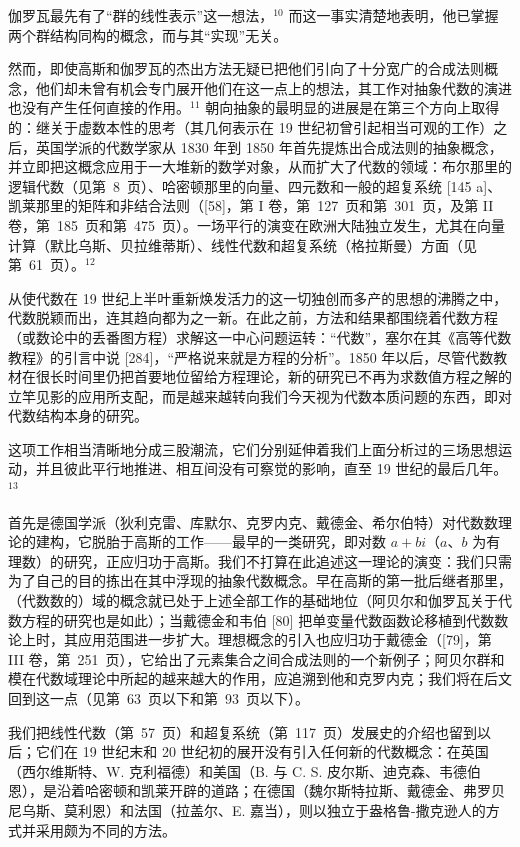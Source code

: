 伽罗瓦最先有了“群的线性表示”这一想法，\(^{10}\) 而这一事实清楚地表明，他已掌握两个群结构同构的概念，而与其“实现”无关。

然而，即使高斯和伽罗瓦的杰出方法无疑已把他们引向了十分宽广的合成法则概念，他们却未曾有机会专门展开他们在这一点上的想法，其工作对抽象代数的演进也没有产生任何直接的作用。\(^{11}\) 朝向抽象的最明显的进展是在第三个方向上取得的：继关于虚数本性的思考（其几何表示在 19 世纪初曾引起相当可观的工作）之后，英国学派的代数学家从 1830 年到 1850 年首先提炼出合成法则的抽象概念，并立即把这概念应用于一大堆新的数学对象，从而扩大了代数的领域：布尔那里的逻辑代数（见第~8~页）、哈密顿那里的向量、四元数和一般的超复系统 {[}145 a{]}、凯莱那里的矩阵和非结合法则（{[}58{]}，第 I 卷，第~127~页和第~301~页，及第 II 卷，第~185~页和第~475~页）。一场平行的演变在欧洲大陆独立发生，尤其在向量计算（默比乌斯、贝拉维蒂斯）、线性代数和超复系统（格拉斯曼）方面（见第~61~页）。\(^{12}\)

从使代数在 19 世纪上半叶重新焕发活力的这一切独创而多产的思想的沸腾之中，代数脱颖而出，连其趋向都为之一新。在此之前，方法和结果都围绕着代数方程（或数论中的丢番图方程）求解这一中心问题运转：“代数”，塞尔在其《高等代数教程》的引言中说 {[}284{]}，“严格说来就是方程的分析”。1850 年以后，尽管代数教材在很长时间里仍把首要地位留给方程理论，新的研究已不再为求数值方程之解的立竿见影的应用所支配，而是越来越转向我们今天视为代数本质问题的东西，即对代数结构本身的研究。

这项工作相当清晰地分成三股潮流，它们分别延伸着我们上面分析过的三场思想运动，并且彼此平行地推进、相互间没有可察觉的影响，直至 19 世纪的最后几年。\(^{13}\)

首先是德国学派（狄利克雷、库默尔、克罗内克、戴德金、希尔伯特）对代数数理论的建构，它脱胎于高斯的工作——最早的一类研究，即对数 \(a + bi\)（\(a\)、\(b\) 为有理数）的研究，正应归功于高斯。我们不打算在此追述这一理论的演变：我们只需为了自己的目的拣出在其中浮现的抽象代数概念。早在高斯的第一批后继者那里，（代数数的）域的概念就已处于上述全部工作的基础地位（阿贝尔和伽罗瓦关于代数方程的研究也是如此）；当戴德金和韦伯 {[}80{]} 把单变量代数函数论移植到代数数论上时，其应用范围进一步扩大。理想概念的引入也应归功于戴德金（{[}79{]}，第 III 卷，第~251~页），它给出了元素集合之间合成法则的一个新例子；阿贝尔群和模在代数域理论中所起的越来越大的作用，应追溯到他和克罗内克；我们将在后文回到这一点（见第~63~页以下和第~93~页以下）。

我们把线性代数（第~57~页）和超复系统（第~117~页）发展史的介绍也留到以后；它们在 19 世纪末和 20 世纪初的展开没有引入任何新的代数概念：在英国（西尔维斯特、W. 克利福德）和美国（B. 与 C. S. 皮尔斯、迪克森、韦德伯恩），是沿着哈密顿和凯莱开辟的道路；在德国（魏尔斯特拉斯、戴德金、弗罗贝尼乌斯、莫利恩）和法国（拉盖尔、E. 嘉当），则以独立于盎格鲁-撒克逊人的方式并采用颇为不同的方法。

